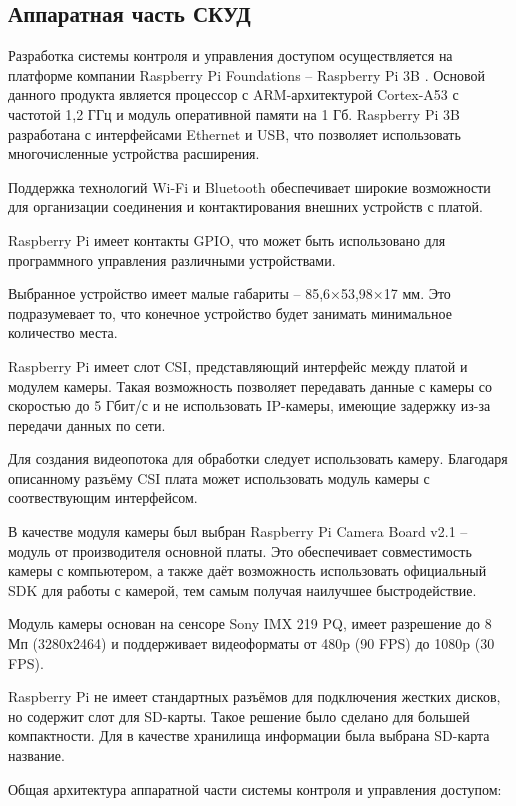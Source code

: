 \subsection{Аппаратная часть СКУД}

Разработка системы контроля и управления доступом осуществляется на платформе
компании Raspberry Pi Foundations -- Raspberry Pi 3B \cite{pi-hardware}. Основой данного продукта является процессор с ARM-архитектурой Cortex-A53 с частотой  1,2 ГГц и модуль оперативной памяти на 1 Гб. Raspberry Pi 3B разработана с интерфейсами Ethernet и USB, что позволяет использовать многочисленные устройства расширения. 

Поддержка технологий Wi-Fi и Bluetooth обеспечивает широкие возможности для организации соединения и контактирования внешних устройств с платой.

Raspberry Pi имеет контакты GPIO, что может быть использовано для программного управления различными устройствами.

Выбранное устройство имеет малые габариты -- 85,6×53,98×17 мм. Это подразумевает то, что конечное устройство будет занимать минимальное количество места. %


Raspberry Pi имеет слот CSI, представляющий интерфейс между платой и модулем камеры. Такая возможность позволяет передавать данные с камеры со скоростью до 5 Гбит/с и не использовать IP-камеры, имеющие задержку из-за передачи данных по сети.

Для создания видеопотока для обработки следует использовать камеру. Благодаря описанному разъёму CSI плата может использовать модуль камеры с соотвествующим интерфейсом.

В качестве модуля камеры был выбран Raspberry Pi Camera Board v2.1 -- модуль от производителя основной платы. Это обеспечивает совместимость камеры с компьютером, а также даёт возможность использовать официальный SDK для работы с камерой, тем самым получая наилучшее быстродействие.


Модуль камеры основан на сенсоре Sony IMX 219 PQ, имеет разрешение до 8 Мп (3280х2464) и поддерживает видеоформаты от 480p (90 FPS) до 1080p (30 FPS).

Raspberry Pi не имеет стандартных разъёмов для подключения жестких дисков, но содержит слот для SD-карты. Такое решение было сделано для большей компактности. Для в качестве хранилища информации была выбрана SD-карта {название}. %

Общая архитектура аппаратной части системы контроля и управления доступом:


